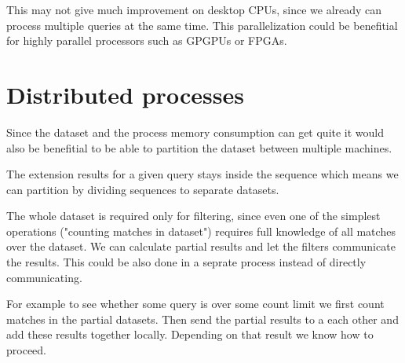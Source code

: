This may not give much improvement on desktop CPUs, since we already can process multiple queries at the same time. This parallelization could be benefitial for highly parallel processors such as GPGPUs or FPGAs.

\section{Distributed processes}

Since the dataset and the process memory consumption can get quite it would also be benefitial to be able to partition the dataset between multiple machines.

The extension results for a given query stays inside the sequence which means we can partition by dividing sequences to separate datasets.

The whole dataset is required only for filtering, since even one of the simplest operations ("counting matches in dataset") requires full knowledge of all matches over the dataset. We can calculate partial results and let the filters communicate the results. This could be also done in a seprate process instead of directly communicating.

\begin{figure}[H]
	\scalebox{0.8}{}
\end{figure}

\begin{exmp}
For example to see whether some query is over some count limit we first count matches in the partial datasets. Then send the partial results to a each other and add these results together locally. Depending on that result we know how to proceed.
\end{exmp}
